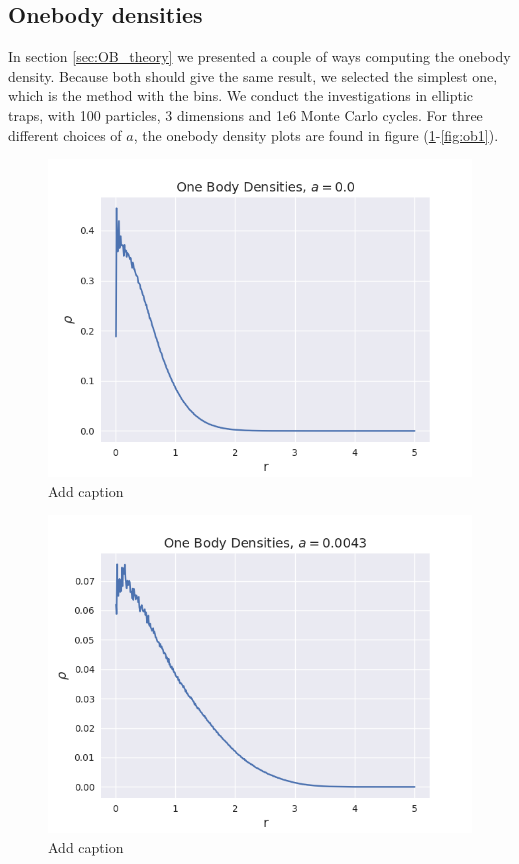 \documentclass[norsk,a4paper,12pt]{article}
\begin{document}
\subsection{Onebody densities}
In section \ref{sec:OB_theory} we presented a couple of ways computing the onebody density. Because both should give the same result, we selected the simplest one, which is the method with the bins. We conduct the investigations in elliptic traps, with 100 particles, 3 dimensions and 1e6 Monte Carlo cycles. For three different choices of $a$, the onebody density plots are found in figure (\ref{fig:ob0}-\ref{fig:ob1}).

\begin{figure} [H]
    \centering
    \includegraphics[scale=0.65]{images/ob_a_0.png}
    \caption{Add caption}
    \label{fig:ob0}
\end{figure} 

\begin{figure} [H]
    \centering
    \includegraphics[scale=0.65]{images/ob_a_00043.png}
    \caption{Add caption}
    \label{fig:ob00043}
\end{figure} 
\end{document}
